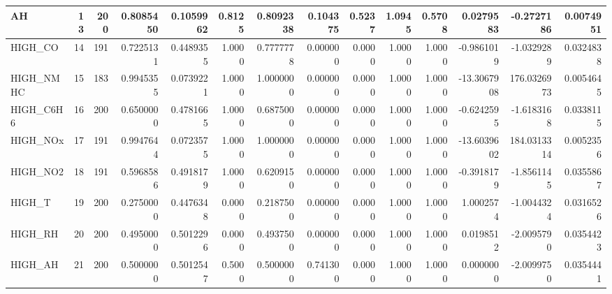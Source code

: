 \begin{tabular}{l|r|r|r|r|r|r|r|r|r|r|r|r|r}
\hline
AH & 13 & 200 & 0.8085450 & 0.1059962 & 0.8125 & 0.8092338 & 0.104375 & 0.5237 & 1.0945 & 0.5708 & 0.0279583 & -0.2727186 & 0.0074951\\
\hline
HIGH\_CO & 14 & 191 & 0.7225131 & 0.4489355 & 1.0000 & 0.7777778 & 0.000000 & 0.0000 & 1.0000 & 1.0000 & -0.9861019 & -1.0329289 & 0.0324838\\
\hline
HIGH\_NMHC & 15 & 183 & 0.9945355 & 0.0739221 & 1.0000 & 1.0000000 & 0.000000 & 0.0000 & 1.0000 & 1.0000 & -13.3067908 & 176.0326973 & 0.0054645\\
\hline
HIGH\_C6H6 & 16 & 200 & 0.6500000 & 0.4781665 & 1.0000 & 0.6875000 & 0.000000 & 0.0000 & 1.0000 & 1.0000 & -0.6242595 & -1.6183168 & 0.0338115\\
\hline
HIGH\_NOx & 17 & 191 & 0.9947644 & 0.0723575 & 1.0000 & 1.0000000 & 0.000000 & 0.0000 & 1.0000 & 1.0000 & -13.6039602 & 184.0313314 & 0.0052356\\
\hline
HIGH\_NO2 & 18 & 191 & 0.5968586 & 0.4918179 & 1.0000 & 0.6209150 & 0.000000 & 0.0000 & 1.0000 & 1.0000 & -0.3918179 & -1.8561145 & 0.0355867\\
\hline
HIGH\_T & 19 & 200 & 0.2750000 & 0.4476348 & 0.0000 & 0.2187500 & 0.000000 & 0.0000 & 1.0000 & 1.0000 & 1.0002574 & -1.0044324 & 0.0316526\\
\hline
HIGH\_RH & 20 & 200 & 0.4950000 & 0.5012296 & 0.0000 & 0.4937500 & 0.000000 & 0.0000 & 1.0000 & 1.0000 & 0.0198512 & -2.0095790 & 0.0354423\\
\hline
HIGH\_AH & 21 & 200 & 0.5000000 & 0.5012547 & 0.5000 & 0.5000000 & 0.741300 & 0.0000 & 1.0000 & 1.0000 & 0.0000000 & -2.0099750 & 0.0354441\\
\hline
\end{tabular}
